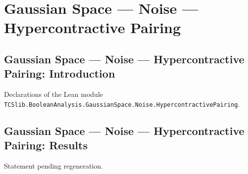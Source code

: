 \section{Gaussian Space --- Noise --- Hypercontractive Pairing}
\subsection*{Gaussian Space --- Noise --- Hypercontractive Pairing: Introduction}

Declarations of the Lean module \texttt{TCSlib.BooleanAnalysis.GaussianSpace.Noise.HypercontractivePairing}.

\subsection*{Gaussian Space --- Noise --- Hypercontractive Pairing: Results}

\begin{lemma}
\label{BooleanAnalysis.GaussianSpace.gaussianNoise_dual_test_bound}
\leanok
{}
Statement pending regeneration.
\end{lemma}
